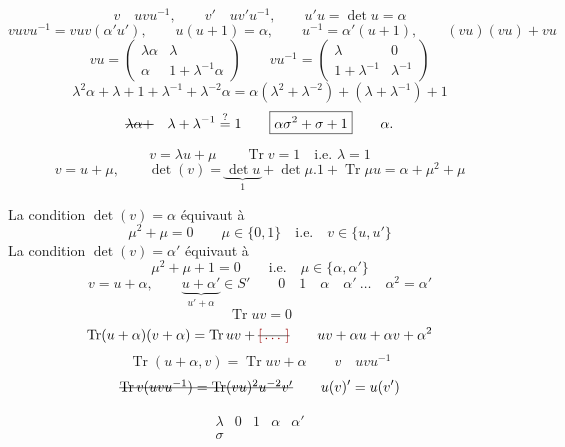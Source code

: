 \documentclass[11pt,a4paper]{article}
\begin{document}
\[
v \quad u v u^{-1}, \qquad v' \quad u v' u^{-1}, \qquad
u' u = \det u = \alpha
\]
\[
v u v u^{-1} = v u v (\alpha' u'), \qquad
u(u+1) = \alpha, \qquad u^{-1} = \alpha'(u+1),
\qquad (vu)(vu) + vu
\]
\[
v u = \begin{pmatrix} \lambda\alpha & \lambda \\ \alpha & 1 + \lambda^{-1}\alpha \end{pmatrix}
\qquad
v u^{-1} = \begin{pmatrix} \lambda & 0 \\ 1 + \lambda^{-1} & \lambda^{-1} \end{pmatrix}
\]
\[
\lambda^2 \alpha + \lambda + 1 + \lambda^{-1} + \lambda^{-2}\alpha
= \alpha(\lambda^2 + \lambda^{-2}) + (\lambda + \lambda^{-1}) + 1
\]
\[
\text{\struck{$\lambda\alpha +$}} \quad \lambda + \lambda^{-1} \overset{?}{=} 1
\qquad \boxed{\alpha\sigma^2 + \sigma + 1} \qquad \alpha .
\]

\[
v = \lambda u + \mu \qquad \operatorname{Tr} v = 1 \quad \text{i.e. } \lambda = 1
\]
\[
v = u + \mu, \qquad
\det(v) = \underbrace{\det u}_{1} + \det \mu.1 + \operatorname{Tr} \mu u
= \alpha + \mu^2 + \mu
\]

La condition $\det(v) = \alpha$ équivaut à
\[
\mu^2 + \mu = 0 \qquad \mu \in \{0, 1\} \quad \text{i.e.} \quad v \in \{u, u'\}
\]
La condition $\det(v) = \alpha'$ équivaut à
\[
\mu^2 + \mu + 1 = 0 \qquad \text{i.e.} \quad \mu \in \{\alpha, \alpha'\}
\]
\[
v = u + \alpha, \qquad \underbrace{u + \alpha'}_{u' + \alpha} \in S'
\qquad 0 \quad 1 \quad \alpha \quad \alpha' \ \ldots \quad \alpha^2 = \alpha'
\]
\[
\operatorname{Tr} u v = 0
\]
\[
\operatorname{Tr}(u + \alpha)(v + \alpha) = \operatorname{Tr} u v
+ \text{\struck{\ill{}}}
\qquad uv + \alpha u + \alpha v + \alpha^2
\]
\[
\operatorname{Tr}(u + \alpha, v) = \operatorname{Tr} u v + \alpha
\qquad v \quad u v u^{-1}
\]
\[
\text{\struck{$\operatorname{Tr} v (u v u^{-1}) = \operatorname{Tr}(v u)^2 u^{-2} v'$}}
\qquad u(v)' = u(v')
\]

\[
\begin{array}{c|cccc}
\lambda & 0 & 1 & \alpha & \alpha' \\ \hline
\sigma & & & &
\end{array}
\]

\end{document}
